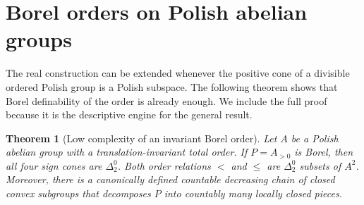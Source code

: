 \documentclass[11pt]{article}
\numberwithin{equation}{section}
\newtheorem{theorem}{Theorem}[section]
\theoremstyle{definition}
\theoremstyle{remark}
\begin{document}
\section{Borel orders on Polish abelian groups}
\label{pma:cp:sec:cones}

The real construction can be extended whenever the positive cone of a
divisible ordered Polish group is a Polish subspace. The following theorem
shows that Borel definability of the order is already enough. We include
the full proof because it is the descriptive engine for the general result.

\begin{theorem}[Low complexity of an invariant Borel order]
\label{pma:cp:thm:cones}
Let $A$ be a Polish abelian group with a translation-invariant total order.
If $P=A_{>0}$ is Borel, then all four sign cones are $\Delta^0_2$.
Both order relations $<$ and $\leq$ are $\Delta^0_2$ subsets of $A^2$.
Moreover, there is a canonically defined countable decreasing chain of
closed convex subgroups that decomposes $P$ into countably many locally
closed pieces.
\end{theorem}
\end{document}
